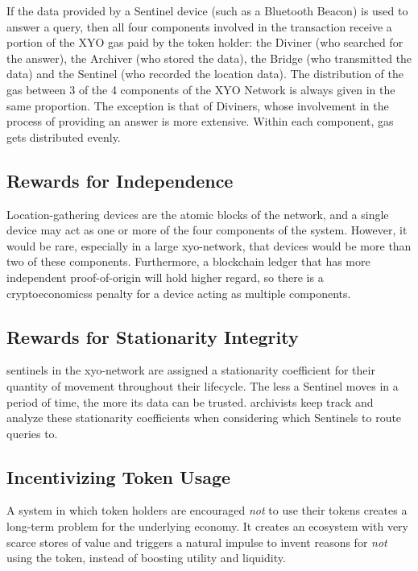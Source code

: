 \documentclass{article}
\begin{document}
If the data provided by a Sentinel device (such as a Bluetooth Beacon) is used to answer a query, then all four components involved in the transaction receive a portion of the XYO gas paid by the token holder: the Diviner (who searched for the answer), the Archiver (who stored the data), the Bridge (who transmitted the data) and the Sentinel (who recorded the location data). The distribution of the gas between 3 of the 4 components of the XYO Network is always given in the same proportion. The exception is that of Diviners, whose involvement in the process of providing an answer is more extensive. Within each component, gas gets distributed evenly.

\subsection{Rewards for Independence}

Location-gathering devices are the atomic blocks of the network, and a single device may act as one or more of the four components of the system. However, it would be rare, especially in a large \Gls{xyo-network}, that devices would be more than two of these components. Furthermore, a blockchain ledger that has more independent \Gls{proof-of-origin} will hold higher regard, so there is a \glspl{cryptoeconomics} penalty for a device acting as multiple components.

\subsection{Rewards for Stationarity Integrity}

\Glspl{sentinel} in the \Gls{xyo-network} are assigned a stationarity coefficient for their quantity of movement throughout their lifecycle. The less a Sentinel moves in a period of time, the more its data can be trusted. \Glspl{archivist} keep track and analyze these stationarity coefficients when considering which Sentinels to route queries to.

\subsection{Incentivizing Token Usage}
A system in which token holders are encouraged \textit{not} to use their tokens creates a long-term problem for the underlying economy. It creates an ecosystem with very scarce stores of value and triggers a natural impulse to invent reasons for \textit{not} using the token, instead of boosting utility and liquidity.
\end{document}
